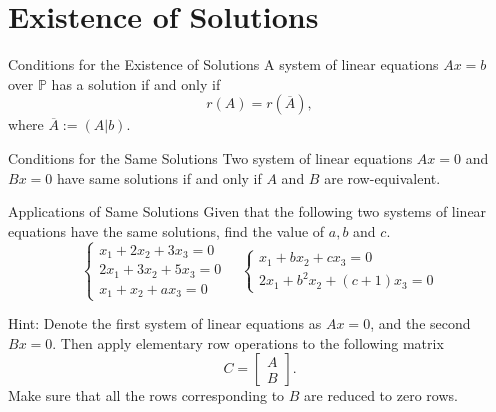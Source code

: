 
\section{Existence of Solutions}

\begin{proposition}{Conditions for the Existence of Solutions}{}
  A system of linear equations $Ax = b$ over $\mathbb{P}$ has a solution
  if and only if 
  \begin{equation}
    r(A) = r(\overline{A}),
  \end{equation}
  where $\overline{A} := (A|b)$.
\end{proposition}

\begin{proposition}{Conditions for the Same Solutions}{}
  Two system of linear equations $Ax = 0$ and $Bx = 0$ have same solutions
  if and only if $A$ and $B$ are row-equivalent.
\end{proposition}

\begin{example}{Applications of Same Solutions}{}
  Given that the following two systems of linear equations have the same
  solutions, find the value of $a,b$ and $c$.
  \begin{equation}
    \begin{cases}
      x_1 + 2x_2 + 3x_3 = 0\\
      2x_1 + 3x_2 + 5x_3=0\\
      x_1 + x_2 + ax_3 = 0
    \end{cases}
    \quad
    \begin{cases}
      x_1 + bx_2 + cx_3 = 0\\
      2x_1 + b^2x_2 + (c+1)x_3 = 0
    \end{cases}
  \end{equation}
\end{example}

\begin{solution}
  Hint: Denote the first system of linear equations as $Ax = 0$, and the second
  $Bx = 0$. Then apply elementary row operations to the following matrix
  \begin{equation}
    C =
    \begin{bmatrix}
      A\\
      B
    \end{bmatrix}.
  \end{equation}
  Make sure that all the rows corresponding to $B$ are reduced to zero rows.
\end{solution}


